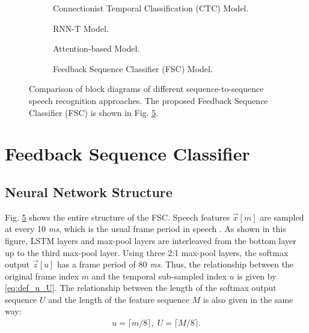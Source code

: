 \documentclass{article}
\begin{document}
\begin{figure}
  \centering
  \begin{subfigure}[b]{0.35\textwidth}
    \centering
    \resizebox{23mm}{!}{
      
    } 
    \caption {
      Connectionist Temporal Classification (CTC) Model.
      \label{fig:ctc_diagram}
    }
  \end{subfigure}
  \begin{subfigure}[b]{0.60\textwidth}
    \centering
    \resizebox{78mm}{!}{
      
    }
    \caption {
      RNN-T Model.
      \label{fig:rnn_t_diagram}
    }
  \end{subfigure}

  \begin{subfigure}[b]{0.55\textwidth}
    \centering
    \resizebox{53mm}{!}{
      
    }
    \caption {
      Attention-based Model.
      \label{fig:attention_diagram}
    }
  \end{subfigure}
  \begin{subfigure}[b]{0.3\textwidth}
    \centering
    \resizebox{26mm}{!}{
      
    }
    \caption {
      Feedback Sequence Classifier (FSC) Model.
      \label{fig:fsc_diagram}
    }
  \end{subfigure}
  \caption{
    Comparison of block diagrams of different sequence-to-sequence speech
    recognition approaches.
    The proposed Feedback Sequence Classifier (FSC) is shown in 
    Fig. \ref{fig:fsc_diagram}.
  }

\end{figure}




\section{Feedback Sequence Classifier}
\label{sec:feedback_sequence_classifier}


\subsection{Neural Network Structure}
\label{sec:neural_network_structure}
Fig. \ref{fig:fsc_diagram} shows the entire structure of the FSC. 
Speech features $\vec{x}[m]$ are sampled 
at every 10 {\it ms}, which is the usual frame period in speech 
\cite{x_huang_prentice_hall_2001_00, c_kim_taslp_2016_00}.
As shown in this figure, LSTM layers and max-pool layers
are interleaved from the bottom layer up to the third max-pool layer.
Using three 2:1 max-pool layers, the softmax output $\vec{z}[u]$ has 
a frame period of 80 {\it ms}.  Thus, the relationship between the original frame 
index $m$ and the temporal sub-sampled index $u$ is given by \eqref{eq:def_u_U}.
The relationship between the length of the softmax output sequence $U$
and the length of the feature sequence $M$ is also given in the same way:
	\begin{align}
		u = \lceil m / 8 \rceil,  \; U = \lceil M / 8 \rceil \label{eq:def_u_U}.
	\end{align}
\end{document}
